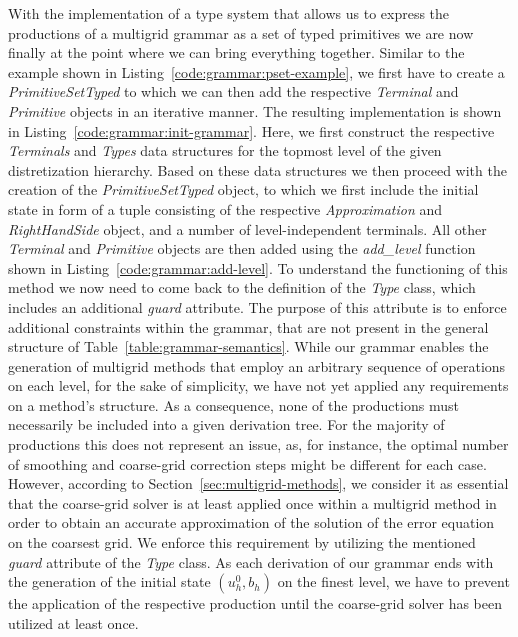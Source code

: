 With the implementation of a type system that allows us to express the productions of a multigrid grammar as a set of typed primitives we are now finally at the point where we can bring everything together.
Similar to the example shown in Listing~\ref{code:grammar:pset-example}, we first have to create a \emph{PrimitiveSetTyped} to which we can then add the respective \emph{Terminal} and \emph{Primitive} objects in an iterative manner.
The resulting implementation is shown in Listing~\ref{code:grammar:init-grammar}.
Here, we first construct the respective \emph{Terminals} and \emph{Types} data structures for the topmost level of the given distretization hierarchy.
Based on these data structures we then proceed with the creation of the \emph{PrimitiveSetTyped} object, to which we first include the initial state in form of a tuple consisting of the respective \emph{Approximation} and \emph{RightHandSide} object, and a number of level-independent terminals.
All other \emph{Terminal} and \emph{Primitive} objects are then added using the \emph{add\_level} function shown in Listing~\ref{code:grammar:add-level}.
To understand the functioning of this method we now need to come back to the definition of the \emph{Type} class, which includes an additional \emph{guard} attribute.
The purpose of this attribute is to enforce additional constraints within the grammar, that are not present in the general structure of Table~\ref{table:grammar-semantics}.
While our grammar enables the generation of multigrid methods that employ an arbitrary sequence of operations on each level, for the sake of simplicity, we have not yet applied any requirements on a method's structure.
As a consequence, none of the productions must necessarily be included into a given derivation tree.
For the majority of productions this does not represent an issue, as, for instance, the optimal number of smoothing and coarse-grid correction steps might be different for each case.
However, according to Section~\ref{sec:multigrid-methods}, we consider it as essential that the coarse-grid solver is at least applied once within a multigrid method in order to obtain an accurate approximation of the solution of the error equation on the coarsest grid.
We enforce this requirement by utilizing the mentioned \emph{guard} attribute of the \emph{Type} class.
As each derivation of our grammar ends with the generation of the initial state $\left(u_h^0, b_h\right)$ on the finest level, we have to prevent the application of the respective production until the coarse-grid solver has been utilized at least once.
 

